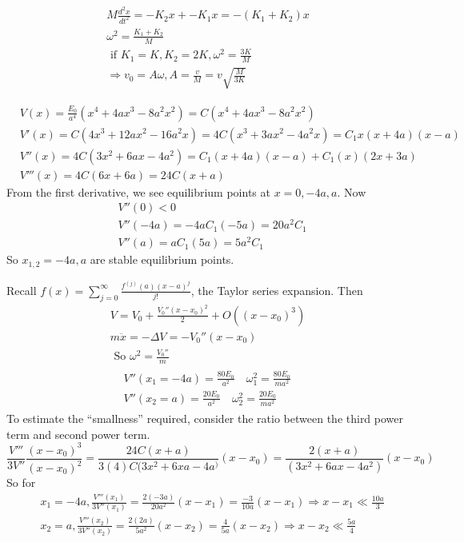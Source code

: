 \documentclass[twoside,10pt]{amsart}
\newcommand{\problemhead}[1]
  {\smallskip
   \noindent{\large\bf Problem #1.}
   \smallskip}
\begin{document}
\problemhead{1.6} \[
\begin{gathered}
  M \frac{ d^2 x}{dt^2} = -K_2 x + -K_1 x = -(K_1 + K_2) x  \\
  \omega^2 = \frac{ K_1 + K_2}{M}  \\
  \text{ if } K_1 = K, K_2 = 2 K, \omega^2 = \frac{ 3K}{M}  \\
  \Longrightarrow v_0 = A \omega, A = \frac{v}{M} = v \sqrt{ \frac{ M}{3K} }
\end{gathered}
\]

\problemhead{1.7} 
\[
\begin{aligned}
  & V(x) = \frac{ E_0 }{ a^4} (x^4 + 4 a x^3 - 8a^2 x^2 ) = C (x^4 + 4 a x^3 - 8 a^2 x^2 )  \\
  & V'(x) = C (4 x^3 + 12 a x^2 -16 a^2 x ) = 4 C ( x^3 + 3 a x^2 - 4 a^2 x ) = C_1 x ( x+4a)(x-a) \\
  & V''(x) = 4 C ( 3 x^2 + 6ax -4a^2 ) = C_1 (x+4a)(x-a) + C_1 (x) (2x + 3a)  \\
  & V'''(x) = 4C (6x +6a) = 24 C( x+a)  
\end{aligned}
\]
From the first derivative, we see equilibrium points at $x = 0 , -4a, a$.  Now
\[
\begin{aligned}
  & V''(0) < 0 \\
  & V''(-4a) = -4a C_1 (-5a) = 20 a^2 C_1  \\
  & V''(a) = a C_1 (5a) = 5a^2 C_1  
\end{aligned}
\] 
So $x_{1,2} = -4a, a$ are stable equilibrium points.  

Recall $f(x) = \sum_{j=0}^{\infty} \frac{ f^{(j)}(a) (x-a)^j }{ j!}$, the Taylor series expansion.  Then
\[
\begin{gathered}
  V= V_0 + \frac{ V_0'' (x-x_0)^2 }{ 2} + O((x-x_0)^3 )  \\
  m\ddot{x} = - \Delta V = -V_0'' (x-x_0)  \\
\text{ So } \boxed{ \omega^2 = \frac{ V_0''}{m}  }  \\
\begin{aligned}
& V''(x_1 = -4a) = \frac{ 80 E_0}{ a^2 } \quad \omega_1^2 = \frac{ 80 E_0 }{ ma^2 }  \\
& V''(x_2 = a) = \frac{ 20 E_0 }{ a^2 } \quad \omega_2^2 = \frac{ 20 E_0}{ ma^2 }
\end{aligned}
\end{gathered}
\]
To estimate the ``smallness'' required, consider the ratio between the third power term and second power term.  
\[
\frac{ V'''}{3 V''}\frac{ (x-x_0)^3 }{ (x-x_0)^2 }= \frac{ 24 C(x+a)}{ 3(4) C (3x^2 + 6xa - 4a^ ) } (x-x_0) = \frac{ 2 (x+a)}{ (3 x^2 + 6ax -4a^2 )}( x-x_0)  
\]
So for 
\[
\begin{aligned}
  & x_1 = -4a, \frac{ V'''(x_1)}{ 3 V''(x_1) } = \frac{ 2 (-3a) }{ 20a^2 } (x-x_1) = \frac{ -3 }{10 a}(x -x_1) \Longrightarrow x - x_1 \ll \frac{10a}{3}  \\
  & x_2 = a, \frac{ V'''(x_2)}{ 3 V''(x_2) } = \frac{ 2 (2a) }{ 5a^2 } (x-x_2) = \frac{ 4 }{5 a}(x -x_2) \Longrightarrow x - x_2 \ll \frac{5a}{4} 
\end{aligned}
\]
\end{document}
